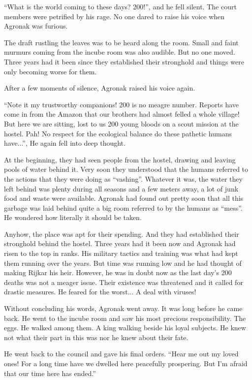 \documentclass[twoside,11pt,titlepage]{article}
\begin{document}
``What is the world coming to these days? 200!'', and he fell silent. The court members were petrified by his rage. No one dared to raise his voice when Agronak was furious.

The draft rustling the leaves was to be heard along the room. Small and faint murmurs coming from the incube room was also audible. But no one moved. Three years had it been since they established their stronghold and things were only becoming worse for them.

After a few moments of silence, Agronak raised his voice again.

``Note it my trustworthy companions! 200 is no meagre number. Reports have come in from the Amazon that our brothers had almost felled a whole village! But here we are sitting, lost to us 200 young bloods on a scout mission at the hostel. Pah! No respect for the ecological balance do these pathetic humans have...'', He again fell into deep thought.

At the beginning, they had seen people from the hostel, drawing and leaving pools of water behind it. Very soon they understood that the humans referred to the actions that they were doing as ``vashing''. Whatever it was, the water they left behind was plenty during all seasons and a few meters away, a lot of junk food and waste were available. Agronak had found out pretty soon that all this garbage was laid behind quite a big room referred to by the humans as ``mess''. He wondered how literally it should be taken.

Anyhow, the place was apt for their spending. And they had established their stronghold behind the hostel. Three years had it been now and Agronak had risen to the top in ranks. His military tactics and training was what had kept them running over the years. But time was running low and he had thought of making Rijkar his heir. However, he was in doubt now as the last day's 200 deaths was not a meager issue. Their existence was threatened and it called for drastic measures. He feared for the worst... A deal with viruses!

Without concluding his words, Agronak went away. It was long before he came back. He went to the incube room and saw his most precious responsibility. The eggs. He walked among them. A king walking beside his loyal subjects. He knew not what their part in this was nor he knew about their fate.

He went back to the council and gave his final orders. ``Hear me out my loved ones! For a long time have we dwelled here peacefully prospering. But I'm afraid that our time here has ended.''
\end{document}

